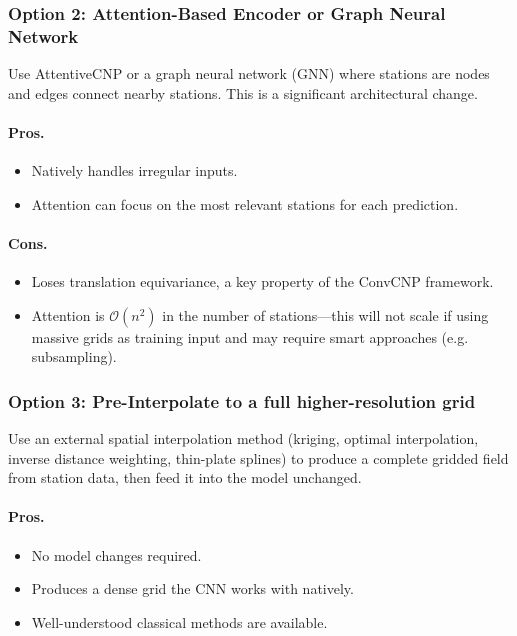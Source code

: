 \subsubsection{Option 2: Attention-Based Encoder or Graph Neural Network}

Use AttentiveCNP or a graph neural network (GNN) where stations are nodes and edges connect nearby stations. This is a significant architectural change.

\paragraph{Pros.}
\begin{itemize}
    \item Natively handles irregular inputs.
    \item Attention can focus on the most relevant stations for each prediction.
\end{itemize}

\paragraph{Cons.}
\begin{itemize}
    \item Loses translation equivariance, a key property of the ConvCNP framework.
    \item Attention is $\mathcal{O}(n^2)$ in the number of stations---this will not scale if using massive grids as training input and may require smart approaches (e.g. subsampling).
\end{itemize}

\subsubsection{Option 3: Pre-Interpolate to a full higher-resolution grid}

Use an external spatial interpolation method (kriging, optimal interpolation, inverse distance weighting, thin-plate splines) to produce a complete gridded field from station data, then feed it into the model unchanged.

\paragraph{Pros.}
\begin{itemize}
    \item No model changes required.
    \item Produces a dense grid the CNN works with natively.
    \item Well-understood classical methods are available.
\end{itemize}

